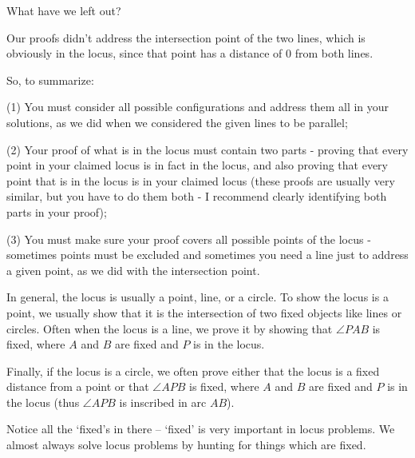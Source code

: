 What have we left out?


Our proofs didn't address the intersection point of the two lines, which is obviously in the locus, since that point has a distance of $0$ from both lines.

\vspace{6pt}
So, to summarize:

(1) You must consider all possible configurations and address them all in your solutions, as we did when we considered the given lines to be parallel;

(2) Your proof of what is in the locus must contain two parts - proving that every point in your claimed locus is in fact in the locus, and also proving that every point that is in the locus is in your claimed locus (these proofs are usually very similar, but you have to do them both - I recommend clearly identifying both parts in your proof);

(3) You must make sure your proof covers all possible points of the locus - sometimes points must be excluded and sometimes you need a line just to address a given point, as we did with the intersection point.

In general, the locus is usually a point, line, or a circle. To show the locus is a point, we usually show that it is the intersection of two fixed objects like lines or circles. Often when the locus is a line, we prove it by showing that $\angle PAB$ is fixed, where $A$ and $B$ are fixed and $P$ is in the locus.

Finally, if the locus is a circle, we often prove either that the locus is a fixed distance from a point or that $\angle APB$ is fixed, where $A$ and $B$ are fixed and $P$ is in the locus (thus $\angle APB$ is inscribed in arc $AB$).

Notice all the `fixed's in there -- `fixed' is very important in locus problems. We almost always solve locus problems by hunting for things which are fixed.

